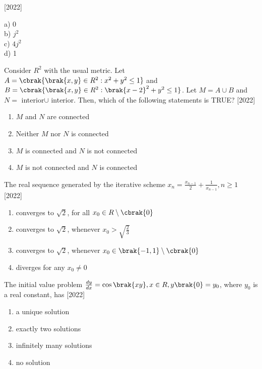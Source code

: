 \hfill{[2022]}
 \begin{multicols}{4}
    a) 0\\
    b) $j^2$\\
    c) $4j^2$\\
    d) 1
\end{multicols}
\item Consider $R^2$ with the usual metric. Let $A=\cbrak{\brak{x,y}\in R^2:x^2+y^2\leq 1}$ and $B=\cbrak{\brak{x,y}\in R^2:\brak{x-2}^2+y^2\leq 1}$. Let $M=A\cup B$ and $N=$ interior$\cup$ interior. Then, which of the following statements is TRUE?
\hfill{[2022]}
\begin{enumerate}
    \item $M$ and $N$ are connected\\
    \item Neither $M$ nor $N$ is connected\\
    \item $M$ is connected and $N$ is not connected\\
    \item $M$ is not connected and $N$ is connected
\end{enumerate}

\item The real sequence generated by the iterative scheme $x_n=\frac{x_{n-1}}{2}+\frac{1}{x_{n-1}},n\geq 1$ \hfill{[2022]}
\begin{enumerate}
    \item converges to $\sqrt{2}$, for all $x_0\in R\setminus\cbrak{0}$\\
    \item converges to $\sqrt{2}$, whenever $x_0>\sqrt{\frac{2}{3}}$\\
    \item converges to $\sqrt{2}$, whenever $x_0\in \brak{-1,1}\setminus\cbrak{0}$ \\
    \item diverges for any $x_0\neq 0$
\end{enumerate}

\item The initial value problem $\frac{dy}{dx}=\cos\brak{xy}, x\in R, y\brak{0}=y_0$, where $y_0$ is a real constant, has
\hfill{[2022]}
\begin{enumerate}
    \item  a unique solution\\
    \item  exactly two solutions\\
    \item  infinitely many solutions\\
    \item  no solution
\end{enumerate}

